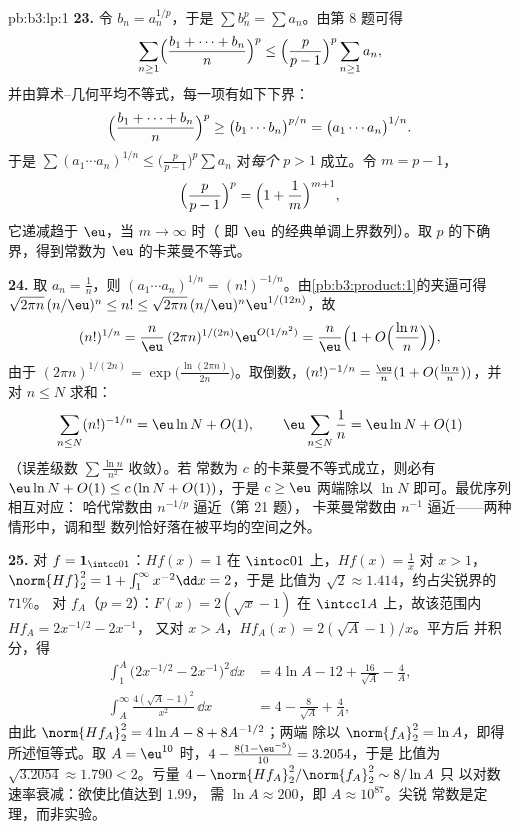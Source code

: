 \begin{solution}{pb:b3:lp:1}
\textbf{23.} 令 $b_n = a_n^{1/p}$，于是 $\sum b_n^p = \sum
a_n$。由第 8 题可得
\[
\sum_{n\geq1}\Bigl(\frac{b_1 + \dots + b_n}n\Bigr)^{p}
\leq \Bigl(\frac p{p-1}\Bigr)^{p}\sum_{n\geq1}a_n,
\]
并由算术–几何平均不等式，每一项有如下下界：
\[
\Bigl(\frac{b_1 + \dots + b_n}n\Bigr)^{p}
\geq \bigl(b_1\cdots b_n\bigr)^{p/n}
= \bigl(a_1\cdots a_n\bigr)^{1/n}.
\]
于是 $\sum(a_1\cdots a_n)^{1/n} \leq \bigl(\frac
p{p-1}\bigr)^p\sum a_n$ 对\emph{每个} $p > 1$ 成立。令 $m =
p - 1$，
\[
\Bigl(\frac p{p-1}\Bigr)^{p} =
\Bigl(1 + \frac1m\Bigr)^{m+1},
\]
它递减趋于 $\eu$，当 $m \to \infty$ 时（
即 $\eu$ 的经典单调上界数列）。取
$p$ 的下确界，得到常数为 $\eu$ 的卡莱曼不等式。

\textbf{24.} 取 $a_n = \frac1n$，则 $(a_1\cdots a_n)^{1/n} =
(n!)^{-1/n}$。由\cref{pb:b3:product:1}的夹逼可得
$\sqrt{2\pi n}\,(n/\eu)^n \leq n! \leq \sqrt{2\pi
n}\,(n/\eu)^n\eu^{1/(12n)}$，故
\[
(n!)^{1/n} = \frac n\eu\,(2\pi n)^{1/(2n)}
\eu^{O(1/n^2)}
= \frac n\eu\Bigl(1 +
O\Bigl(\frac{\ln n}{n}\Bigr)\Bigr),
\]
由于 $(2\pi n)^{1/(2n)} = \exp\bigl(\frac{\ln(2\pi
n)}{2n}\bigr)$。取倒数，$(n!)^{-1/n} = \frac\eu n(1 +
O(\frac{\ln n}n))$，并对 $n \leq N$ 求和：
\[
\sum_{n\leq N}(n!)^{-1/n}
= \eu\ln N + O(1),
\qquad
\eu\sum_{n\leq N}\frac1n = \eu\ln N + O(1)
\]
（误差级数 $\sum\frac{\ln n}{n^2}$ 收敛）。若
常数为 $c$ 的卡莱曼不等式成立，则必有 $\eu\ln N
+ O(1) \leq c\,(\ln N + O(1))$，于是 $c \geq \eu$
两端除以 $\ln N$ 即可。最优序列相互对应：
哈代常数由 $n^{-1/p}$ 逼近（第 21 题），
卡莱曼常数由 $n^{-1}$ 逼近——两种情形中，调和型
数列恰好落在被平均的空间之外。

\textbf{25.} 对 $f = \mathbf 1_{\intcc01}$：$Hf(x) = 1$ 在
$\intoc01$ 上，$Hf(x) = \frac1x$ 对 $x > 1$，
$\norm{Hf}_2^2 = 1 + \int_1^\infty x^{-2}\dd x = 2$，于是
比值为 $\sqrt2 \approx 1.414$，约占尖锐界的 $71\%$。
对 $f_A$（$p = 2$）：$F(x) = 2(\sqrt x - 1)$ 在
$\intcc1A$ 上，故该范围内 $Hf_A = 2x^{-1/2} - 2x^{-1}$，
又对 $x > A$，$Hf_A(x) = 2(\sqrt A - 1)/x$。平方后
并积分，得
\begin{align*}
\int_1^A\bigl(2x^{-1/2} - 2x^{-1}\bigr)^2\dd x
&= 4\ln A - 12 + \frac{16}{\sqrt A} - \frac4A,\\
\int_A^{\infty}\frac{4(\sqrt A - 1)^2}{x^2}\,\dd x
&= 4 - \frac{8}{\sqrt A} + \frac4A,
\end{align*}
由此 $\norm{Hf_A}_2^2 = 4\ln A - 8 + 8A^{-1/2}$；两端
除以 $\norm{f_A}_2^2 = \ln A$，即得所述恒等式。取 $A
= \eu^{10}$ 时，$4 - \frac{8(1 - \eu^{-5})}{10} = 3.2054$，于是
比值为 $\sqrt{3.2054} \approx 1.790 < 2$。亏量
$4 - \norm{Hf_A}_2^2/\norm{f_A}_2^2 \sim 8/\ln A$ 只
以对数速率衰减：欲使比值达到 $1.99$，
需 $\ln A \approx 200$，即 $A \approx 10^{87}$。尖锐
常数是定理，而非实验。
\end{solution}
